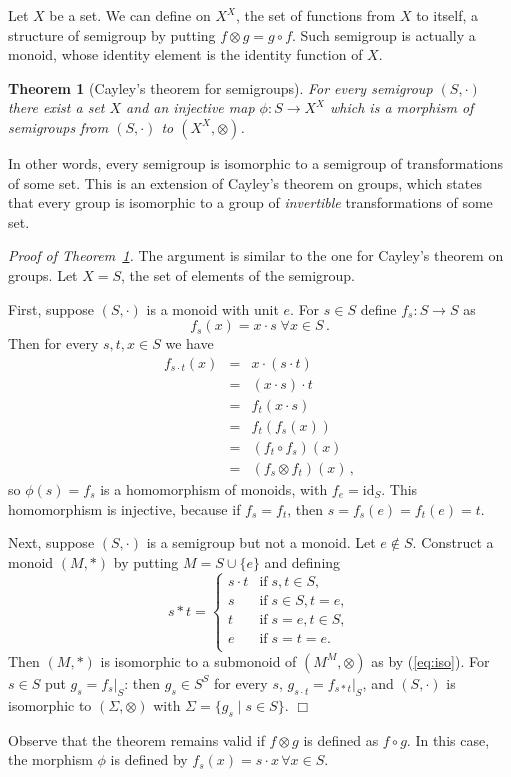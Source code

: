 \documentclass[12pt]{article}
\newcommand{\restrict}[2]{\left.{#1}\right|_{#2}}
\newtheorem{theorem}{Theorem}
\begin{document}
Let $X$ be a set.
We can define on $X^X$,
the set of functions from $X$ to itself,
a structure of semigroup by putting
$f\otimes g=g\circ f$.
Such semigroup is actually a monoid,
whose identity element is the identity function of $X$.
\begin{theorem}[Cayley's theorem for semigroups] \label{thm:cay-sg}
For every semigroup $(S,\cdot)$
there exist a set $X$
and an injective map $\phi:S\to X^X$
which is a morphism of semigroups from $(S,\cdot)$ to $(X^X,\otimes)$.
\end{theorem}
In other words,
every semigroup is isomorphic to
a semigroup of transformations of some set.
This is an extension of Cayley's theorem on groups,
which states that every group is isomorphic to
a group of \emph{invertible} transformations of some set.

\textit{Proof of Theorem~\ref{thm:cay-sg}.}
The argument is similar to the one for Cayley's theorem on groups.
Let $X=S$, the set of elements of the semigroup.

First, suppose $(S,\cdot)$ is a monoid with unit $e$.
For $s\in S$ define $f_s:S\to S$ as
\begin{equation} \label{eq:iso}
f_s(x)=x\cdot s\;\forall x\in S\,.
\end{equation}
Then for every $s,t,x\in S$ we have
\begin{eqnarray*}
f_{s\cdot t}(x)
& = & x\cdot(s\cdot t) \\
& = & (x\cdot s)\cdot t \\
& = & f_t(x\cdot s) \\
& = & f_t(f_s(x)) \\
& = & (f_t\circ f_s)(x) \\
& = & (f_s\otimes f_t)(x)\,,
\end{eqnarray*}
so $\phi(s)=f_s$ is a homomorphism of monoids,
with $f_e=\mathrm{id}_S$.
This homomorphism is injective,
because if $f_s=f_t$,
then $s=f_s(e)=f_t(e)=t$.

Next, suppose $(S,\cdot)$ is a semigroup but not a monoid.
Let $e\not\in S$.
Construct a monoid $(M,\ast)$ by putting $M=S\cup\{e\}$ and defining
\begin{displaymath}
s\ast t=\left\{\begin{array}{ll}
s\cdot t & \mathrm{if}\;s,t\in S, \\
s & \mathrm{if}\;s\in S,t=e, \\
t & \mathrm{if}\;s=e,t\in S, \\
e & \mathrm{if}\;s=t=e. \\
\end{array}\right.
\end{displaymath}
Then $(M,\ast)$ is isomorphic to a submonoid of $(M^M,\otimes)$
as by (\ref{eq:iso}).
For $s\in S$ put $g_s=\restrict{f_s}{S}$:
then $g_s\in S^S$ for every $s$,
$g_{s\cdot t}=\restrict{f_{s\ast t}}{S}$,
and $(S,\cdot)$ is isomorphic to $(\Sigma,\otimes)$
with $\Sigma=\{g_s\mid s\in S\}$.
$\Box$

Observe that the theorem remains valid
if $f\otimes g$ is defined as $f\circ g$.
In this case, the morphism $\phi$ is defined by
$f_s(x)=s\cdot x\,\forall x\in S$.
\end{document}
